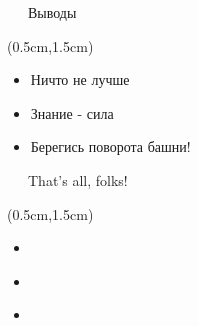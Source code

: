 \documentclass[xetex,18pt,aspectratio=43]{beamer}
\begin{document}
\begin{Large}
\begin{frame}{\ \ \ Выводы}
\begin{textblock*}{\framewidth-0.8cm}(0.5cm,1.5cm)
\begin{itemize}
  \item Ничто не лучше
  \item Знание - сила
  \item Берегись поворота башни!
\end{itemize}
\end{textblock*}
\end{frame}

\begin{frame}{\ \ \ That's all, folks!}
\begin{textblock*}{\framewidth-0.8cm}(0.5cm,1.5cm)
\begin{itemize}
  \item \href{mailto:alexclear@gmail.com}{\color{blue}{alexclear@gmail.com}}
  \item \href{https://telegram.me/lhommequipleure}{\color{blue}{https://telegram.me/lhommequipleure}}
  \item \href{https://telegram.me/demeliorator\_pod}{\color{blue}{https://telegram.me/demeliorator\_pod}}
\end{itemize}
\end{textblock*}
\end{frame}

\end{Large}
\end{document}
